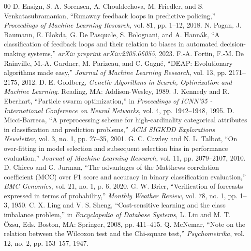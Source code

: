 \documentclass[conference]{IEEEtran}
\begin{document}
\begin{thebibliography}{00}
 D. Ensign, S. A. Sorensen, A. Chouldechova, M. Friedler, and S. Venkatasubramanian, ``Runaway feedback loops in predictive policing,'' \emph{Proceedings of Machine Learning Research}, vol. 81, pp. 1--12, 2018.
 N. Pagan, J. Baumann, E. Elokda, G. De Pasquale, S. Bolognani, and A. Hann\'{a}k, ``A classification of feedback loops and their relation to biases in automated decision-making systems,'' \emph{arXiv preprint arXiv:2305.06055}, 2023.
 F.-A. Fortin, F.-M. De Rainville, M.-A. Gardner, M. Parizeau, and C. Gagn\'{e}, ``DEAP: Evolutionary algorithms made easy,'' \emph{Journal of Machine Learning Research}, vol. 13, pp. 2171--2175, 2012.
 D. E. Goldberg, \emph{Genetic Algorithms in Search, Optimization and Machine Learning}. Reading, MA: Addison-Wesley, 1989.
 J. Kennedy and R. Eberhart, ``Particle swarm optimization,'' in \emph{Proceedings of ICNN'95 - International Conference on Neural Networks}, vol. 4, pp. 1942--1948, 1995.
 D. Micci-Barreca, ``A preprocessing scheme for high-cardinality categorical attributes in classification and prediction problems,'' \emph{ACM SIGKDD Explorations Newsletter}, vol. 3, no. 1, pp. 27--35, 2001.
 G. C. Cawley and N. L. Talbot, ``On over-fitting in model selection and subsequent selection bias in performance evaluation,'' \emph{Journal of Machine Learning Research}, vol. 11, pp. 2079--2107, 2010.
 D. Chicco and G. Jurman, ``The advantages of the Matthews correlation coefficient (MCC) over F1 score and accuracy in binary classification evaluation,'' \emph{BMC Genomics}, vol. 21, no. 1, p. 6, 2020.
 G. W. Brier, ``Verification of forecasts expressed in terms of probability,'' \emph{Monthly Weather Review}, vol. 78, no. 1, pp. 1--3, 1950.
 C. X. Ling and V. S. Sheng, ``Cost-sensitive learning and the class imbalance problem,'' in \emph{Encyclopedia of Database Systems}, L. Liu and M. T. \"{O}zsu, Eds. Boston, MA: Springer, 2008, pp. 411--415.
 Q. McNemar, ``Note on the relation between the Wilcoxon test and the Chi-square test,'' \emph{Psychometrika}, vol. 12, no. 2, pp. 153--157, 1947.
\end{thebibliography}
\end{document}
